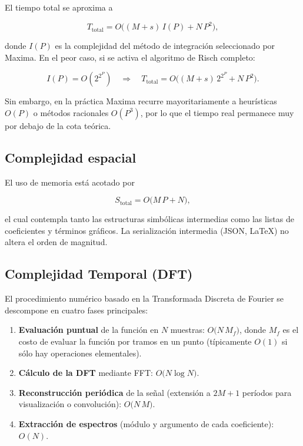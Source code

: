 El tiempo total se aproxima a

\[
T_{\text{total}} =
O\!\bigl((M+s)\,I(P)+N\,P^2\bigr),
\]

\noindent donde $I(P)$ es la complejidad del método de integración
seleccionado por Maxima.  
En el peor caso, si se activa el algoritmo de Risch completo:

\[
I(P)=O(2^{2^{P}}) \quad\Longrightarrow\quad
T_{\text{total}}=O\!\bigl((M+s)\,2^{2^{P}}+N\,P^2\bigr).
\]

Sin embargo, en la práctica Maxima recurre mayoritariamente a heurísticas
$O(P)$ o métodos racionales $O(P^3)$, por lo que el tiempo real permanece
muy por debajo de la cota teórica.

\subsection{Complejidad espacial}

El uso de memoria está acotado por

\[
S_{\text{total}}=O\!\bigl(M\,P+N\bigr),
\]

\noindent el cual contempla tanto las estructuras simbólicas intermedias
como las listas de coeficientes y términos gráficos.  
La serialización intermedia (JSON, \LaTeX) no altera el orden de
magnitud.

\subsection{Complejidad Temporal (DFT)}

El procedimiento numérico basado en la Transformada Discreta de Fourier
se descompone en cuatro fases principales:

\begin{enumerate}
	\item \textbf{Evaluación puntual} de la función en $N$ muestras: 
	$O\bigl(N \, M_{f}\bigr)$, donde $M_{f}$ es el costo de evaluar la
	función por tramos en un punto (típicamente $O(1)$ si sólo hay
	operaciones elementales).
	\item \textbf{Cálculo de la DFT} mediante FFT: 
	$O\bigl(N \log N\bigr)$.
	\item \textbf{Reconstrucción periódica} de la señal (extensión a
	$2M{+}1$ períodos para visualización o convolución): 
	$O\bigl(N \, M\bigr)$.
	\item \textbf{Extracción de espectros} (módulo y argumento de cada
	coeficiente): $O(N)$.
\end{enumerate}

